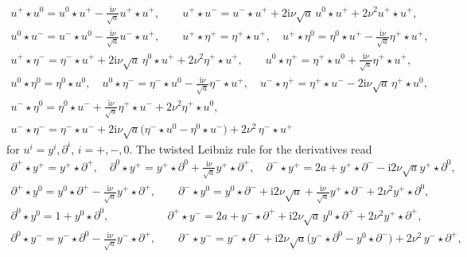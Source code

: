 \documentclass[a4paper,11pt]{article}
\begin{document}
\begin{align*}
 u^+\!\star\! u^0=u^0\!\star\! u^+\!-\!\frac{\mathrm{i}\nu}{\sqrt{a}}u^+\!\star\! u^+, 
\qquad  u^+\!\star\! u^-=u^-\!\star\! u^+\!+\!2 \mathrm{i}\nu \sqrt{a}\, u^0\!\star\! u^+
\!+\! 2\nu^2u^+\!\star\! u^+, \\[8pt]
 u^0\!\star\! u^-=u^-\!\star\! u^0\!-\!\frac{\mathrm{i}\nu}{\sqrt{a}}u^-\!\star\! u^+, 
\qquad u^+\!\star\! \eta^+=\eta^+\!\star\! u^+, \quad 
u^+\!\star\! \eta^0=\eta^0\!\star\! u^+-\frac{\mathrm{i}\nu}{\sqrt{a}}\eta^+\!\star\! u^+,\\[8pt]
u^+\!\star\! \eta^-=\eta^-\!\star\! u^++2 \mathrm{i}\nu \sqrt{a}\, \eta^0\!\star\! u^+\!+\! 2\nu^2\eta^+\!\star\! u^+,
\qquad  u^0\!\star\! \eta^+=\eta^+\!\star\! u^0+\frac{\mathrm{i}\nu}{\sqrt{a}}\eta^+\!\star\! u^+ ,  \\[8pt]
u^0\!\star\! \eta^0=\eta^0\!\star\! u^0, \quad 
u^0\!\star\! \eta^-=\eta^-\!\star\! u^0-\frac{\mathrm{i}\nu}{\sqrt{a}}\eta^-\!\star\! u^+,\quad
u^-\!\star\! \eta^+=\eta^+\!\star\! u^--2\mathrm{i}\nu \sqrt{a}\,\eta^+\!\star\! u^0,\\[8pt] 
u^-\!\star\! \eta^0=\eta^0\!\star\! u^-+\frac{\mathrm{i}\nu}{\sqrt{a}}\eta^+\!\star\! u^-
+2\nu^2\eta^+\!\star\! u^0,\\[8pt] 
u^-\!\star\! \eta^-=\eta^-\!\star\! u^-+2\mathrm{i}\nu \sqrt{a}\big(\eta^-\!\star\! u^0-\eta^0\!\star\! u^-\big)+2\nu^2 \,\eta^-\!\star\! u^+
\end{align*}
for $u^i=y^i,\partial^i$, $i=+,-,0$. 
The twisted Leibniz rule for the derivatives read
\begin{align*}
\partial^+\!\star\! y^+=y^+\!\star\! \partial^+, \quad  \partial^0\!\star\! y^+
=y^+\!\star\! \partial^0+\frac{\mathrm{i}\nu}{\sqrt{a}}y^+\!\star\! \partial^+ , \quad
\partial^-\!\star\! y^+=2a+y^+\!\star\! \partial^--\mathrm{i}2\nu \sqrt{a}y^+\!\star\! \partial^0,\\[8pt] 
\partial^+\!\star\! y^0=y^0\!\star\! \partial^+-\frac{\mathrm{i}\nu}{\sqrt{a}}y^+\!\star\! \partial^+,\qquad 
\partial^-\!\star\! y^0=y^0\!\star\! \partial^-+\mathrm{i}2\nu\sqrt{a}+
\frac{\mathrm{i}\nu}{\sqrt{a}}y^+\!\star\! \partial^-
+2\nu^2y^+\!\star\! \partial^0,\\[8pt] 
 \partial^0\!\star\! y^0=1+y^0\!\star\! \partial^0, \qquad \qquad\quad \:
\partial^+\!\star\! y^-=2a+y^-\!\star\! \partial^++\mathrm{i}2 \nu \sqrt{a}\, y^0\!\star\! \partial^+
+2 \nu^2 y^+\!\star\! \partial^+,\\[8pt]
\partial^0\!\star\! y^-=y^-\!\star\! \partial^0-\frac{\mathrm{i}\nu}{\sqrt{a}}y^-\!\star\! \partial^+, 
\qquad
\partial^-\!\star\! y^-=y^-\!\star\! \partial^-+\mathrm{i}2 \nu \sqrt{a}\big(y^-\!\star\! \partial^0-y^0\!\star\! \partial^-\big)+2\nu^2 \,y^-\!\star\! \partial^+,
\end{align*}
\end{document}
